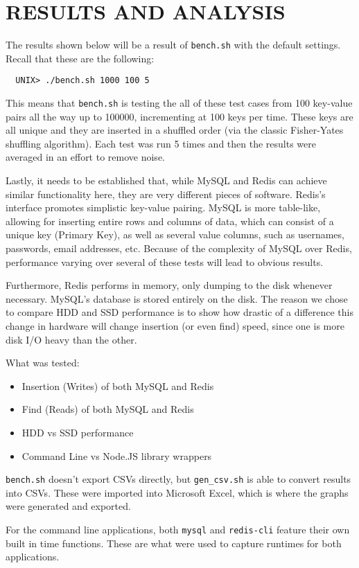 \documentclass[letterpaper, 10 pt, conference]{ieeeconf}
\begin{document}
\section{RESULTS AND ANALYSIS}
The results shown below will be a result of \texttt{bench.sh} with the default settings. Recall that these are the following:
\begin{verbatim}
  UNIX> ./bench.sh 1000 100 5  
\end{verbatim}
This means that \texttt{bench.sh} is testing the all of these test cases from 100 key-value pairs all the way up to 100000, incrementing at 100 keys per time. These keys are all unique and they are inserted in a shuffled order (via the classic Fisher-Yates shuffling algorithm). Each test was run 5 times and then the results were averaged in an effort to remove noise.


Lastly, it needs to be established that, while MySQL and Redis can achieve similar functionality here, they are very different pieces of software. Redis's interface promotes simplistic key-value pairing. MySQL is more table-like, allowing for inserting entire rows and columns of data, which can consist of a unique key (Primary Key), as well as several value columns, such as usernames, passwords, email addresses, etc. Because of the complexity of MySQL over Redis, performance varying over several of these tests will lead to obvious results.


Furthermore, Redis performs in memory, only dumping to the disk whenever necessary. MySQL's database is stored entirely on the disk. The reason we chose to compare HDD and SSD performance is to show how drastic of a difference this change in hardware will change insertion (or even find) speed, since one is more disk I/O heavy than the other.


What was tested:
\begin{itemize}
    \item Insertion (Writes) of both MySQL and Redis
    \item Find (Reads) of both MySQL and Redis
    \item HDD vs SSD performance
    \item Command Line vs Node.JS library wrappers
\end{itemize}
\texttt{bench.sh} doesn't export CSVs directly, but \texttt{gen\_csv.sh} is able to convert results into CSVs. These were imported into Microsoft Excel, which is where the graphs were generated and exported.


For the command line applications, both \texttt{mysql} and \texttt{redis-cli} feature their own built in time functions. These are what were used to capture runtimes for both applications.
\end{document}
